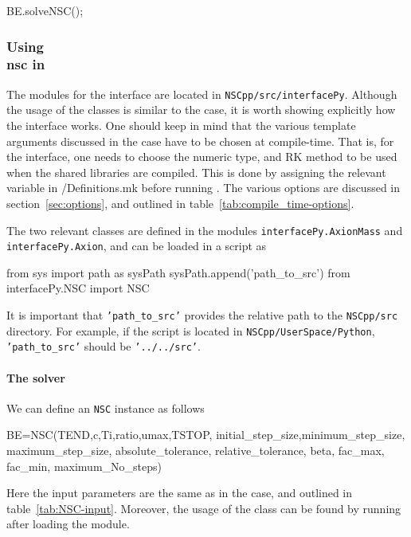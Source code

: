 \documentclass[11pt,a4paper]{article}
\begin{document}
%
\begin{cpp}
	BE.solveNSC();
\end{cpp}



\subsubsection{Using \\nsc in \PY}\label{sec:begin_py}
%
The modules for the \PY interface are located in {\tt NSCpp/src/interfacePy}. Although the usage of the classes is similar to the \CPP case, it is worth showing explicitly how the \PY interface works. One should keep in mind that the various template arguments discussed in the \CPP case have to be chosen at compile-time. That is, for the \PY interface, one needs to choose the numeric type, and RK method to be used when the shared libraries are compiled. This is done by assigning the relevant variable in {\nsc/Definitions.mk} before running . The various options are discussed in section~\ref{sec:options}, and outlined in table~\ref{tab:compile_time-options}.

 
The two relevant classes are defined in the modules {\tt interfacePy.AxionMass} and {\tt interfacePy.Axion}, and can be loaded in a \PY script as 
%
\begin{py}
	from sys import path as sysPath
	sysPath.append('path_to_src')
	from interfacePy.NSC import NSC 
\end{py}
%
It is important that {\tt 'path\_to\_src'} provides the relative path to the {\tt NSCpp/src} directory. For example, if the script is located in {\tt NSCpp/UserSpace/Python}, {\tt 'path\_to\_src'} should be {\tt '../../src'}.

\paragraph{The solver}
%
We can define an {\tt NSC} instance as follows 
%
\begin{py}
	BE=NSC(TEND,c,Ti,ratio,umax,TSTOP,
		   initial_step_size,minimum_step_size, maximum_step_size, absolute_tolerance, 
		   relative_tolerance, beta, fac_max, fac_min, maximum_No_steps)
\end{py}
%
Here the input parameters are the same as in the \CPP case, and outlined in table~\ref{tab:NSC-input}. Moreover, the usage of the class can be found by running  after loading the module. 
\end{document}
